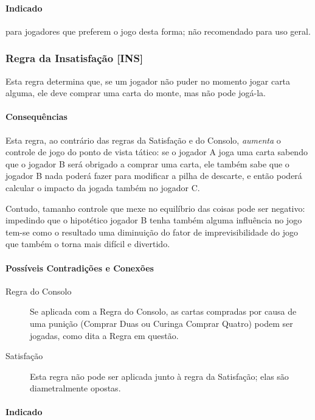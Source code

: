 \paragraph{Indicado} 

para jogadores que preferem o jogo desta forma; não recomendado para uso geral.

\subsubsection{Regra da Insatisfação [INS]}

\label{insatisfacao}

Esta regra determina que, se um jogador não puder no momento jogar carta alguma, ele deve comprar uma carta do monte, mas não pode jogá-la.

\paragraph{Consequências}

Esta regra, ao contrário das regras da Satisfação e do Consolo, \emph{aumenta} o controle de jogo do ponto de vista tático: se o jogador A joga uma carta sabendo que o jogador B será obrigado a comprar uma carta, ele também sabe que o jogador B nada poderá fazer para modificar a pilha de descarte, e então poderá calcular o impacto da jogada também no jogador C.

Contudo, tamanho controle que mexe no equilíbrio das coisas pode ser negativo: impedindo que o hipotético jogador B tenha também alguma influência no jogo tem-se como o resultado uma diminuição do fator de imprevisibilidade do jogo que também o torna mais difícil e divertido.

\paragraph{Possíveis Contradições e Conexões}

\begin{description}
\item[Regra do Consolo]{Se aplicada com a Regra do Consolo, as cartas compradas por causa de uma punição (Comprar Duas ou Curinga Comprar Quatro) podem ser jogadas, como dita a Regra em questão.}
\item[Satisfação]{Esta regra não pode ser aplicada junto à regra da Satisfação; elas são diametralmente opostas.}
\end{description}

\paragraph{Indicado} 

